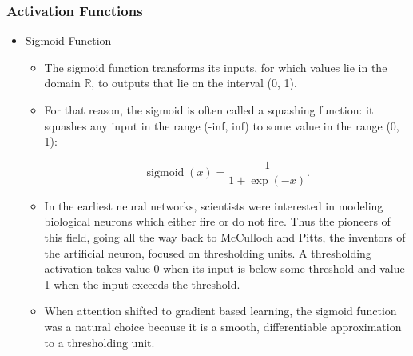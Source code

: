 \documentclass[
  shownotes,
  xcolor={svgnames},
  hyperref={colorlinks,citecolor=DarkBlue,linkcolor=DarkRed,urlcolor=DarkBlue}
  , aspectratio=169]{beamer}
\begin{document}
\begin{frame}
\frametitle{Activation Functions}





\begin{itemize}

\item Sigmoid Function

\begin{itemize}



\item The sigmoid function transforms its inputs, for which values lie in the domain $\mathbb{R}$, to outputs that lie on the interval (0, 1). 
\item For that reason, the sigmoid is often called a squashing function: it squashes any input in the range (-inf, inf) to some value in the range (0, 1):

$$\operatorname{sigmoid}(x) = \frac{1}{1 + \exp(-x)}.$$

\item In the earliest neural networks, scientists were interested in modeling biological neurons which either fire or do not fire. Thus the pioneers of this field, going all the way back to McCulloch and Pitts, the inventors of the artificial neuron, focused on thresholding units. A thresholding activation takes value 0 when its input is below some threshold and value 1 when the input exceeds the threshold.

\item When attention shifted to gradient based learning, the sigmoid function was a natural choice because it is a smooth, differentiable approximation to a thresholding unit. 

    \end{itemize}
\end{itemize}    



\end{frame}
\end{document}
